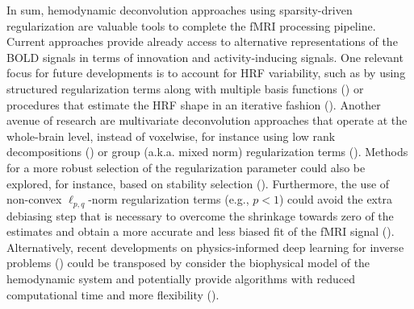 In sum, hemodynamic deconvolution approaches using sparsity-driven regularization are valuable tools to complete the fMRI processing pipeline. Current approaches provide already access to alternative representations of the BOLD signals in terms of innovation and activity-inducing signals. One relevant focus for future developments is to account for HRF variability, such as by using structured regularization terms along with multiple basis functions (\citealt{Gaudes2012Structuredsparsedeconvolution}) or procedures that estimate the HRF shape in an iterative fashion (\citealt{Farouj2019BoldSignalDeconvolution,cherkaoui:hal-03005584}). Another avenue of research are multivariate deconvolution approaches that operate at the whole-brain level, instead of voxelwise, for instance using low rank decompositions (\citealt{cherkaoui:hal-03005584, Urunuela_2021}) or group (a.k.a. mixed norm) regularization terms (\citealt{urunuela-tremino_2019}). Methods for a more robust selection of the regularization parameter could also be explored, for instance, based on stability selection (\citealt{Meinshausen2010Stabilityselection,Urunuela2020StabilityBasedSparse}). Furthermore, the use of non-convex \(\ell_{p,q}\)-norm regularization terms (e.g., \(p < 1\)) could avoid the extra debiasing step that is necessary to overcome the shrinkage towards zero of the estimates and obtain a more accurate and less biased fit of the fMRI signal  (\citealt{Gaudes2013Paradigmfreemapping,CaballeroGaudes2019deconvolutionalgorithmmulti}). Alternatively, recent developments on physics-informed deep learning for inverse problems (\citealt{Akcakaya2021,Monga2021,Ongie2020}) could be transposed by consider the biophysical model of the hemodynamic system and potentially provide algorithms with reduced computational time and more flexibility (\citealt{Cherkaoui_2020}).